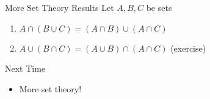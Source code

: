 \documentclass{beamer}
\begin{document}
\begin{frame}{More Set Theory Results}
Let $A,B,C$ be sets
\begin{enumerate}
\item $A\cap (B\cup C) = (A\cap B)\cup (A\cap C)$
\item $A\cup (B\cap C) = (A\cup B)\cap (A\cap C)$ (exercise)
\end{enumerate}
\end{frame}

\begin{frame}{Next Time}
\begin{itemize}
\item More set theory!
\end{itemize}
\end{frame}
\end{document}
